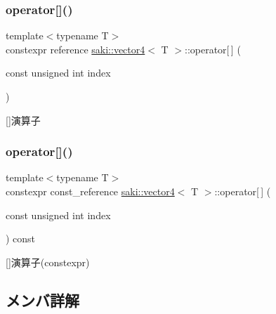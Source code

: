 \subsubsection{\texorpdfstring{operator[]()}{operator[]()}\hspace{0.1cm}{\footnotesize\ttfamily [1/2]}}
{\footnotesize\ttfamily template$<$typename T$>$ \\
constexpr reference \mbox{\hyperlink{classsaki_1_1vector4}{saki\+::vector4}}$<$ T $>$\+::operator\mbox{[}$\,$\mbox{]} (\begin{DoxyParamCaption}\item[{const unsigned int}]{index }\end{DoxyParamCaption})\hspace{0.3cm}{\ttfamily [inline]}}



\mbox{[}\mbox{]}演算子 

\mbox{\label{classsaki_1_1vector4_a545d7cafc89c0267507e5c42f0963c18}} 
\subsubsection{\texorpdfstring{operator[]()}{operator[]()}\hspace{0.1cm}{\footnotesize\ttfamily [2/2]}}
{\footnotesize\ttfamily template$<$typename T$>$ \\
constexpr const\+\_\+reference \mbox{\hyperlink{classsaki_1_1vector4}{saki\+::vector4}}$<$ T $>$\+::operator\mbox{[}$\,$\mbox{]} (\begin{DoxyParamCaption}\item[{const unsigned int}]{index }\end{DoxyParamCaption}) const\hspace{0.3cm}{\ttfamily [inline]}}



\mbox{[}\mbox{]}演算子(constexpr) 



\subsection{メンバ詳解}
\mbox{\label{classsaki_1_1vector4_a4db38b2a56279d65d701b14c21f7b073}} 
